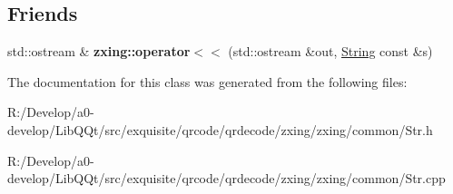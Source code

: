 \subsection*{Friends}
\begin{DoxyCompactItemize}
\item 
\mbox{\label{classzxing_1_1_string_ab3bf240068694373701830b5b4a2bc36}} 
std\+::ostream \& {\bfseries zxing\+::operator$<$$<$} (std\+::ostream \&out, \mbox{\hyperlink{classzxing_1_1_string}{String}} const \&s)
\end{DoxyCompactItemize}


The documentation for this class was generated from the following files\+:\begin{DoxyCompactItemize}
\item 
R\+:/\+Develop/a0-\/develop/\+Lib\+Q\+Qt/src/exquisite/qrcode/qrdecode/zxing/zxing/common/Str.\+h\item 
R\+:/\+Develop/a0-\/develop/\+Lib\+Q\+Qt/src/exquisite/qrcode/qrdecode/zxing/zxing/common/Str.\+cpp\end{DoxyCompactItemize}
